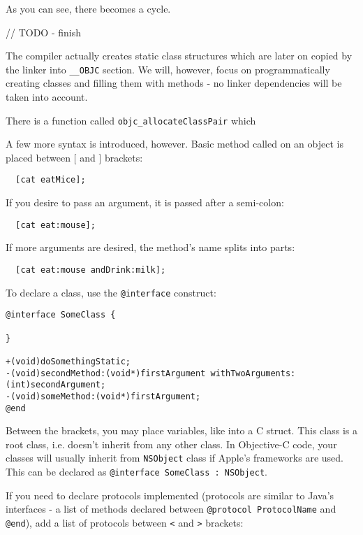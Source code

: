 \documentclass[a4paper, 11pt, fleqn]{book}
\begin{document}
As you can see, there becomes a cycle.

// TODO - finish

The compiler actually creates static class structures which are later on copied by the linker into \verb=__OBJC= section. We will, however, focus on programmatically creating classes and filling them with methods - no linker dependencies will be taken into account.

There is a function called \verb=objc_allocateClassPair= which 





A few more syntax is introduced, however. Basic method called on an object is placed between [ and ] brackets:

\begin{verbatim}
  [cat eatMice];
\end{verbatim}

If you desire to pass an argument, it is passed after a semi-colon:

\begin{verbatim}
  [cat eat:mouse];
\end{verbatim}

If more arguments are desired, the method's name splits into parts:

\begin{verbatim}
  [cat eat:mouse andDrink:milk];
\end{verbatim}

To declare a class, use the \verb=@interface= construct:

\begin{verbatim}
@interface SomeClass {

}

+(void)doSomethingStatic;
-(void)secondMethod:(void*)firstArgument withTwoArguments:(int)secondArgument;
-(void)someMethod:(void*)firstArgument;
@end

\end{verbatim}

Between the { } brackets, you may place variables, like into a C struct. This class is a root class, i.e. doesn't inherit from any other class. In Objective-C code, your classes will usually inherit from \verb=NSObject= class if Apple's frameworks are used. This can be declared as \verb=@interface SomeClass : NSObject=.

If you need to declare protocols implemented (protocols are similar to Java's interfaces - a list of methods declared between \verb=@protocol ProtocolName= and \verb=@end=), add a list of protocols between \verb=<= and \verb=>= brackets:
\end{document}
